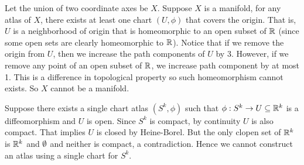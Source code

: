 \documentclass[12pt]{article}
\begin{document}
\begin{problem}[1.7]
Let the union of two coordinate axes be $ X$.  Suppose $ X$ is a manifold, for any atlas of $ X$, there exists at least one chart $ (U,\phi)$ that covers the origin. That is, $ U$ is a neighborhood of origin that is homeomorphic to an open subset of  $ \mathbb{R}$ (since some open sets are clearly homeomorphic to $ \mathbb{R}$). Notice that if we remove the origin from $ U$, then we increase the path components of  $ U$ by 3. However, if we remove any point of an open subset of $ \mathbb{R}$, we increase path component by at most 1. This is a difference in topological property so such homeomorphism cannot exists. So $ X$ cannot be a manifold. 
\end{problem}

\begin{problem}[1.11]
Suppose there exists a single chart atlas $ (S^{k}, \phi)$ such that $ \phi: S^{k} \to U \subseteq \mathbb{R}^{k}$ is a diffeomorphism and $ U$ is open. Since $ S^{k}$ is compact, by continuity $ U$ is also compact. That implies $ U$ is closed by Heine-Borel. But the only clopen set of  $ \mathbb{R}^{k}$ is $ \mathbb{R}^{k}$ and $ \emptyset$ and neither is compact, a contradiction. Hence we cannot construct an atlas using a single chart for $ S^{k}$.
\end{problem}
\end{document}
